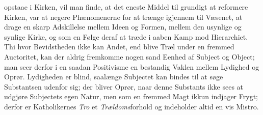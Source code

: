\documentclass[12pt]{book}
\begin{document}
opstaae i Kirken, vil man finde, at det eneste Middel til grundigt at
reformere Kirken, var at negere Phænomenerne for at trænge igjennem til
Væsenet, at drage en skarp Adskillelse mellem Ideen og Formen, mellem den
usynlige og synlige Kirke, og som en Følge deraf at træde i aaben Kamp mod
Hierarchiet. Thi hvor Bevidstheden ikke kan Andet, end blive Træl under en
fremmed Auctoritet, kan der aldrig fremkomme nogen sand Eenhed af Subject og
Object; man seer derfor i en saadan Positivisme en bestandig Vaklen mellem
Lydighed og Oprør. Lydigheden er blind, saalænge Subjectet kan bindes til at
søge Substantsen udenfor sig; der bliver Oprør, naar denne Substants ikke
sees at udgjøre Subjectets egen Natur, men som en fremmed Magt ikkun indjager
Frygt; derfor er Katholikernes \emph{Tro} et \emph{Trældoms}forhold og
indeholder altid en vis Mistro.
\end{document}
